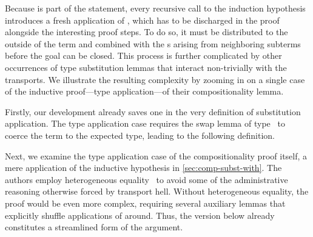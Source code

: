\documentclass[manuscript,screen,review,anonymous,acmsmall]{acmart}
\newcommand{\transferhellinline}[1]{%
  \sbox{\transferhellinlinebox}{#1}%
  \colorbox{transferhellbg}{\usebox{\transferhellinlinebox}}}
\begin{document}
\noindent Because  is part of the statement, every
recursive call to the induction hypothesis introduces a 
fresh application of , which has to be discharged
in the proof alongside the interesting proof steps.
To do so, it must be distributed to the outside of the term and combined with the
s arising from neighboring subterms before the goal
can be closed. This process is further complicated by other occurrences of type substitution
lemmas that interact non-trivially with the
transports. We illustrate the resulting
complexity by zooming in on a single case of the inductive proof---type
application---of their compositionality lemma.

Firstly, our development already saves one
 in the very definition of substitution application.
The type application case requires the swap lemma of type
\transferhellinline{\ExportSwap}\ to coerce the term to the expected type, leading to the following
definition.
\begin{transferhellbox}
\ExportSubstInDef
\end{transferhellbox}

\noindent Next, we examine the type application case
of the compositionality proof itself, a mere application of the
inductive hypothesis in  \cref{sec:comp-subst-with}. The authors employ heterogeneous
equality~\cite{DBLP:conf/types/McBride00} to avoid some of the
administrative reasoning otherwise forced by transport hell. Without
heterogeneous equality, the proof would be even more complex,
requiring several auxiliary lemmas that explicitly shuffle applications
of  around. Thus, the version below already
constitutes a streamlined form of the argument.
\begin{transferhellbox}
\ExportProofTerm
\end{transferhellbox}
\end{document}

